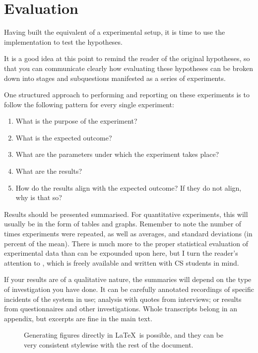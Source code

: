 \chapter{Evaluation}
\label{cha:evaluation}

Having built the equivalent of a experimental setup, it is time to use
the implementation to test the hypotheses.

It is a good idea at this point to remind the reader of the original
hypotheses, so that you can communicate clearly how evaluating these
hypotheses can be broken down into stages and subquestions manifested as a
series of experiments.

One structured approach to performing and reporting on these experiments is
to follow the following pattern for every single experiment:

\begin{enumerate}
\item What is the purpose of the experiment?
\item What is the expected outcome?
\item What are the parameters under which the experiment takes place?
\item What are the results?
\item How do the results align with the expected outcome? If they do not
  align, why is that so?
\end{enumerate}

Results should be presented summarised. For quantitative experiments, this
will usually be in the form of tables and graphs.  Remember to note the
number of times experiments were repeated, as well as averages, and standard
deviations (in percent of the mean).  There is much more to the proper
statistical evaluation of experimental data than can be expounded upon here,
but I turn the reader's attention to \citep{Downey2011:TSPASFP2011}, which
is freely available and written with CS students in mind.

If your results are of a qualitative nature, the summaries will depend on
the type of investigation you have done. It can be carefully annotated
recordings of specific incidents of the system in use; analysis with quotes
from interviews; or results from questionnaires and other investigations.
Whole transcripts belong in an appendix, but excerpts are fine in the main
text.



\begin{figure}
  \myfloatalign
  \caption[A graph with error bars]{Generating figures directly in \LaTeX\ is possible, and they can be very consistent stylewise with the rest of the document.}
  \label{fig:pretty-graph}
\end{figure}



